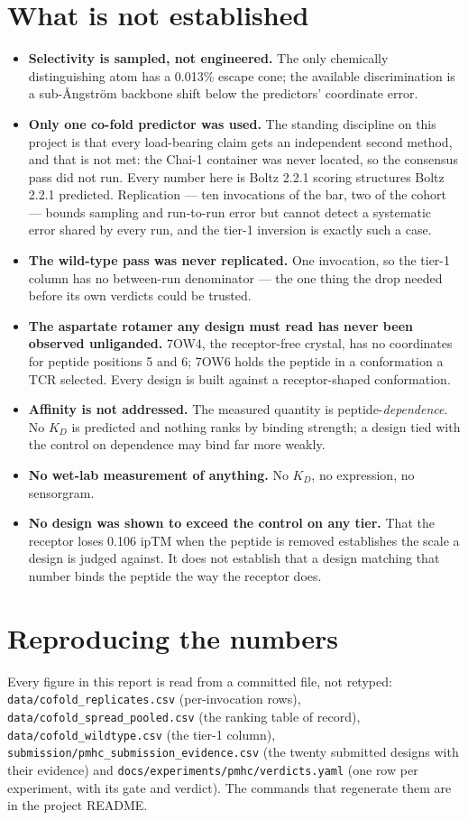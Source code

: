 \documentclass[11pt,a4paper]{article}
\begin{document}
\section{What is not established}

\begin{itemize}\itemsep2pt
\item \textbf{Selectivity is sampled, not engineered.} The only chemically distinguishing atom has
a 0.013\% escape cone; the available discrimination is a sub-\AA ngstr\"om backbone shift below the
predictors' coordinate error.
\item \textbf{Only one co-fold predictor was used.} The standing discipline on this project is
that every load-bearing claim gets an independent second method, and that is not met: the Chai-1
container was never located, so the consensus pass did not run. Every number here is Boltz 2.2.1
scoring structures Boltz 2.2.1 predicted. Replication --- ten invocations of the bar, two of the
cohort --- bounds sampling and run-to-run error but cannot detect a systematic error shared by
every run, and the tier-1 inversion is exactly such a case.
\item \textbf{The wild-type pass was never replicated.} One invocation, so the tier-1 column has
no between-run denominator --- the one thing the drop needed before its own verdicts could be
trusted.
\item \textbf{The aspartate rotamer any design must read has never been observed unliganded.}
7OW4, the receptor-free crystal, has no coordinates for peptide positions 5 and 6; 7OW6 holds the
peptide in a conformation a TCR selected. Every design is built against a receptor-shaped
conformation.
\item \textbf{Affinity is not addressed.} The measured quantity is peptide-\emph{dependence}. No
$K_D$ is predicted and nothing ranks by binding strength; a design tied with the control on
dependence may bind far more weakly.
\item \textbf{No wet-lab measurement of anything.} No $K_D$, no expression, no sensorgram.
\item \textbf{No design was shown to exceed the control on any tier.} That the receptor loses
0.106 ipTM when the peptide is removed establishes the scale a design is judged against. It does
not establish that a design matching that number binds the peptide the way the receptor does.
\end{itemize}

\section*{Reproducing the numbers}

\sloppy
Every figure in this report is read from a committed file, not retyped:
\texttt{data/cofold\_replicates.csv} (per-invocation rows),
\texttt{data/cofold\_spread\_pooled.csv} (the ranking table of record),
\texttt{data/cofold\_wildtype.csv} (the tier-1 column),
\texttt{submission/pmhc\_submission\_evidence.csv} (the twenty submitted designs with their
evidence) and \texttt{docs/experiments/pmhc/verdicts.yaml} (one row per experiment, with its
gate and verdict). The commands that regenerate them are in the project README.
\end{document}
